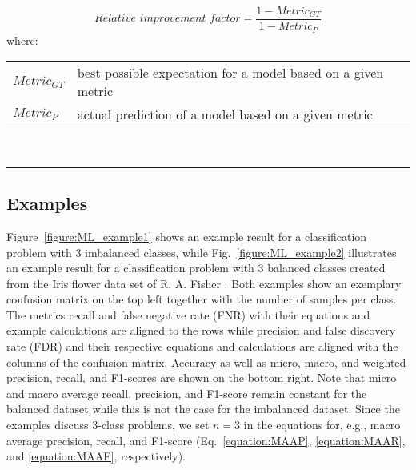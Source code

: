 \documentclass{article}
\makeatletter
\newenvironment{conditions}[1][where:]
	{\hspace{0.02\textwidth} #1 \begin{tabular}[t]{>{$}l<{$} @{${}={}$} l}}
	{\end{tabular}\\[\belowdisplayskip]}
\makeatother
\begin{document}
\begin{equation}
	\textit{Relative improvement factor} = \dfrac{1 - \textit{Metric}_{\textit{GT}}}{1 - \textit{Metric}_P}
%
	\label{equation:relative_improvement_factor}
\end{equation}
%
\begin{conditions}
	\textit{Metric}_{\textit{GT}} & best possible expectation for a model based on a given metric \\
	\textit{Metric}_P             & actual prediction of a model based on a given metric
\end{conditions}

\hrule




\clearpage
\subsection*{Examples}

Figure~\ref{figure:ML_example1} shows an example result for a classification problem with 3 imbalanced classes, while Fig.~\ref{figure:ML_example2} illustrates an example result for a classification problem with 3 balanced classes created from the Iris flower data set of R. A. Fisher \cite{fisher1936use}. Both examples show an exemplary confusion matrix on the top left together with the number of samples per class. The metrics recall and false negative rate (FNR) with their equations and example calculations are aligned to the rows while precision and false discovery rate (FDR) and their respective equations and calculations are aligned with the columns of the confusion matrix. Accuracy as well as micro, macro, and weighted precision, recall, and F1-scores are shown on the bottom right. Note that micro and macro average recall, precision, and F1-score remain constant for the balanced dataset while this is not the case for the imbalanced dataset. Since the examples discuss 3-class problems, we set $n = 3$ in the equations for, e.g., macro average precision, recall, and F1-score (Eq.~\ref{equation:MAAP}, \ref{equation:MAAR}, and \ref{equation:MAAF}, respectively).
\end{document}
